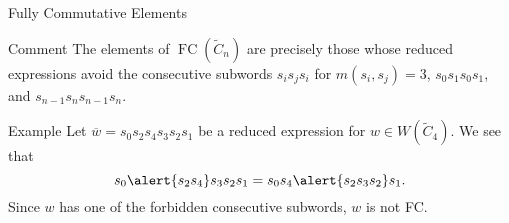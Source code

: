 \documentclass[9pt,handout]{beamer}
\newcommand{\w}{\overline{w}}
\DeclareMathOperator{\FC}{FC}
\newcommand{\C}{\widetilde{C}}
\begin{document}

\begin{frame}{Fully Commutative Elements}
\begin{block}{Comment}
	The elements of $\FC(\C_n)$ are precisely those whose reduced expressions avoid the consecutive subwords $s_is_js_i$ for $m(s_i,s_j)=3$, $s_0s_1s_0s_1$, and $s_{n-1}s_ns_{n-1}s_n$.
\end{block}

\pause

\begin{block}{Example}
	Let $\w=s_0s_2s_4s_3s_2s_1$ be a reduced expression for $w \in W(\C_4)$. We see that
	\[s_0\alert{s_2s_4}s_3s_2s_1=s_0s_4\alert{s_2s_3s_2}s_1.\]
	Since $w$ has one of the forbidden consecutive subwords, $w$ is \alert{not} FC.
\end{block}
		
\end{frame}

\end{document}
